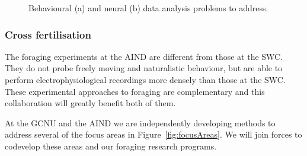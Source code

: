 \begin{figure}
    \centering
    \subfloat[]{
        \resizebox{3.0in}{!}{%
            
        }
    }
    \hfill
    \subfloat[]{
        \resizebox{2.25in}{!}{%
            
        }
    }
    \caption{Behavioural (a) and neural (b) data analysis problems to address.}
    \label{fig:dataAnalysis}
\end{figure}

\subsubsection{Cross fertilisation}

The foraging experiments at the AIND are different from those at the SWC. They
do not probe freely moving and naturalistic behaviour, but are able to perform
electrophysiological recordings more densely than those at the SWC.
%
These experimental approaches to foraging are complementary and this
collaboration will greatly benefit both of them.

At the GCNU and the AIND we are independently developing methods to address
several of the focus areas in Figure~\ref{fig:focusAreas}. We will join forces
to codevelop these areas and our foraging research programs.

